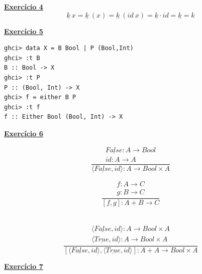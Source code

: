 \documentclass[a4paper,11pt]{article}
\begin{document}
	\noindent \underline{\textbf{Exercício 4}}\\
	\[
	\underline{k} \ x = \underline{k} \ (x) = \underline{k} \ (id \ x) = \underline{k} \cdot id = \underline{k} = k
	\]
	
	\noindent \underline{\textbf{Exercício 5}}
	
\begin{verbatim}
ghci> data X = B Bool | P (Bool,Int)
ghci> :t B
B :: Bool -> X
ghci> :t P
P :: (Bool, Int) -> X
ghci> f = either B P
ghci> :t f
f :: Either Bool (Bool, Int) -> X
\end{verbatim}
	
	\noindent \underline{\textbf{Exercício 6}}\\
	
	\begin{minipage}{0.5\textwidth}
		\[
		\frac{
			\begin{array}{c}
				\underline{False}: A \rightarrow Bool \\
				id: A \rightarrow A
			\end{array}
		}{
			\langle \underline{False}, id \rangle : A \rightarrow Bool \times A
		}
		\]
	\end{minipage}
	\hfill
	\begin{minipage}{0.5\textwidth}
		\[
		\frac{
			\begin{array}{c}
				f: A \rightarrow C \\
				g: B \rightarrow C
			\end{array}
		}{
			[f, g]: A + B \rightarrow C
		}
		\]
	\end{minipage}\\
	
	
		\[
		\frac{
			\begin{array}{c}
				\langle \underline{False}, id \rangle : A \rightarrow Bool \times A \\
				\langle \underline{True}, id \rangle : A \rightarrow Bool \times A
			\end{array}
		}{
			[\langle \underline{False}, id \rangle, \langle \underline{True}, id \rangle]: A + A \rightarrow Bool \times A
		}
		\]
	
	
	\newpage
	
	\noindent \underline{\textbf{Exercício 7}}\\
	
\end{document}

